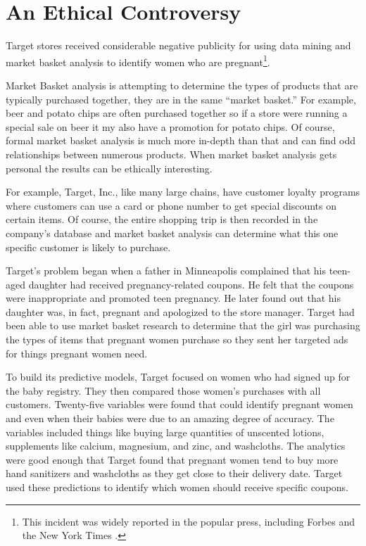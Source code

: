 \section{An Ethical Controversy}

Target stores received considerable negative publicity for using data mining and market basket analysis to identify women who are pregnant\footnote{This incident was widely reported in the popular press, including Forbes \cite{hill2012target} and the New York Times \cite{duhigg2012companies}.}. 

Market Basket analysis is attempting to determine the types of products that are typically purchased together, they are in the same ``market basket.'' For example, beer and potato chips are often purchased together so if a store were running a special sale on beer it my also have a promotion for potato chips. Of course, formal market basket analysis is much more in-depth than that and can find odd relationships between numerous products. When market basket analysis gets personal the results can be ethically interesting.

For example, Target, Inc., like many large chains, have customer loyalty programs where customers can use a card or phone number to get special discounts on certain items. Of course, the entire shopping trip is then recorded in the company's database and market basket analysis can determine what this one specific customer is likely to purchase.

Target's problem began when a father in Minneapolis complained that his teen-aged daughter had received pregnancy-related coupons. He felt that the coupons were inappropriate and promoted teen pregnancy. He later found out that his daughter was, in fact, pregnant and apologized to the store manager. Target had been able to use market basket research to determine that the girl was purchasing the types of items that pregnant women purchase so they sent her targeted ads for things pregnant women need.

To build its predictive models, Target focused on women who had signed up for the baby registry. They then compared those women’s purchases with all customers. Twenty-five variables were found that could identify pregnant women and even when their babies were due to an amazing degree of accuracy. The variables included things like buying large quantities of unscented lotions, supplements like calcium, magnesium, and zinc, and washcloths. The analytics were good enough that Target found that pregnant women tend to buy more hand sanitizers and washcloths as they get close to their delivery date. Target used these predictions to identify which women should receive specific coupons. 

